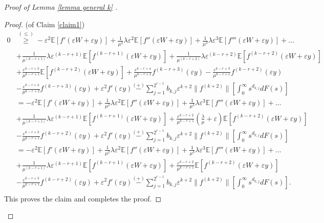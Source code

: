 \documentclass[11pt,letterpaper,reqno]{article}
\theoremstyle{thmstyleone}%
\theoremstyle{thmstyletwo}%
\theoremstyle{thmstylethree}%
\numberwithin{equation}{section}
\begin{document}
\begin{proof}[Proof of Lemma \ref{lemma general k} ]
\begin{proof}{(of Claim \ref{claim1}) }
\begin{align*}
    0 &\stackrel{(\leq)} {\geq} -\varepsilon^2\mathbb E[f'(\varepsilon W+\varepsilon y)]+\frac{1}{\mu^2}\lambda \varepsilon^2 \mathbb E[f''(\varepsilon W+\varepsilon y)]+\frac{1}{\mu^3}\lambda \varepsilon^3 \mathbb E[f'''(\varepsilon W+\varepsilon y)]+ \ldots \nonumber\\
    \nonumber &+\frac{1}{\mu^{(k-r+1)}}\lambda \varepsilon^{(k-r+1)}\mathbb E[f^{(k-r+1)}(\varepsilon W+\varepsilon y)]+\frac{1}{\mu^{(k-r+2)}}\lambda \varepsilon^{(k-r+2)}\mathbb E[f^{(k-r+2)}(\varepsilon W+\varepsilon y)]\\
    &+\frac{\varepsilon^{k-r+3}}{\mu^{k-r+1}}\mathbb E[f^{(k-r+2)}(\varepsilon W+\varepsilon y)]+\frac{\varepsilon^{k-r+4}}{\mu^{k-r+2}}f^{(k-r+3)}(\varepsilon y)-\frac{\varepsilon^{k-r+3}}{\mu^{k-r+1}}f^{(k-r+2)}(\varepsilon y)\\
    &-\frac{\varepsilon^{k-r+4}}{\mu^{k-r+2}}f^{(k-r+3)}(\varepsilon y)+\varepsilon^2 f'(\varepsilon y)\stackrel{(+)}{-}\sum_{j=1}^{2^{r-1}}b_{k,j} \varepsilon^{k+2} \|f^{(k+2)}\|\left[ \int_0^\infty s^{d_{k,j}} dF(s)\right]\\
    &=-\varepsilon^2\mathbb E[f'(\varepsilon W+\varepsilon y)]+\frac{1}{\mu^2}\lambda \varepsilon^2 \mathbb E[f''(\varepsilon W+\varepsilon y)]+\frac{1}{\mu^3}\lambda \varepsilon^3 \mathbb E[f'''(\varepsilon W+\varepsilon y)]+ \ldots \nonumber\\
     &+\frac{1}{\mu^{(k-r+1)}}\lambda \varepsilon^{(k-r+1)}\mathbb E[f^{(k-r+1)}(\varepsilon W+\varepsilon y)]+\frac{\varepsilon^{k-r+2}}{\mu^{k-r+1}}\left( \frac{\lambda}{\mu}+\varepsilon\right)\mathbb E[f^{(k-r+2)}(\varepsilon W+\varepsilon y)]\\
    &-\frac{\varepsilon^{k-r+3}}{\mu^{k-r+1}}f^{(k-r+2)}(\varepsilon y)+\varepsilon^2 f'(\varepsilon y)\stackrel{(+)}{-}\sum_{j=1}^{2^{r-1}}b_{k,j} \varepsilon^{k+2}\|f^{(k+2)}\| \left[ \int_0^\infty s^{d_{k,j}} dF(s)\right]\\
     &=-\varepsilon^2\mathbb E[f'(\varepsilon W+\varepsilon y)]+\frac{1}{\mu^2}\lambda \varepsilon^2 \mathbb E[f''(\varepsilon W+\varepsilon y)]+\frac{1}{\mu^3}\lambda \varepsilon^3 \mathbb E[f'''(\varepsilon W+\varepsilon y)]+ \ldots \nonumber\\
     &+\frac{1}{\mu^{(k-r+1)}}\lambda \varepsilon^{(k-r+1)}\mathbb E[f^{(k-r+1)}(\varepsilon W+\varepsilon y)]+\frac{\varepsilon^{k-r+2}}{\mu^{k-r+1}}\mathbb E[f^{(k-r+2)}(\varepsilon W+\varepsilon y)]\\
    &-\frac{\varepsilon^{k-r+3}}{\mu^{k-r+1}}f^{(k-r+2)}(\varepsilon y)+\varepsilon^2 f'(\varepsilon y)\stackrel{(+)}{-}\sum_{j=1}^{2^{r-1}}b_{k,j} \varepsilon^{k+2} \|f^{(k+2)}\| \left[ \int_0^\infty s^{d_{k,j}} dF(s)\right].\\
\end{align*}
This proves the claim and completes the proof.
\end{proof}
\end{proof}
\end{document}
